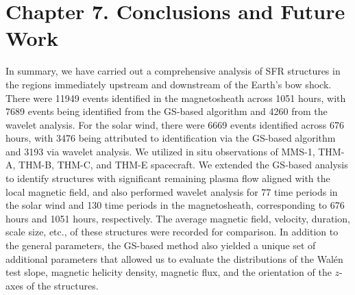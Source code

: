 \chapter{Chapter 7. Conclusions and Future Work}

In summary, we have carried out a comprehensive analysis of SFR structures in the regions immediately upstream and downstream of the Earth's bow shock. There were 11949 events identified in the magnetosheath across 1051 hours, with 7689 events being identified from the GS-based algorithm and 4260 from the wavelet analysis. For the solar wind, there were 6669 events identified across 676 hours, with 3476 being attributed to identification via the GS-based algorithm and 3193 via wavelet analysis. We utilized in situ observations of MMS-1, THM-A, THM-B, THM-C, and THM-E spacecraft. We extended the GS-based analysis to identify structures with significant remaining plasma flow aligned with the local magnetic field, and also performed wavelet analysis for 77 time periods in the solar wind and 130 time periods in the magnetosheath, corresponding to 676 hours and 1051 hours, respectively. The average magnetic field, velocity, duration, scale size, etc., of these structures were recorded for comparison. In addition to the general parameters, the GS-based method also yielded a unique set of additional parameters that allowed us to evaluate the distributions of the Wal\'en test slope, magnetic helicity density, magnetic flux, and the orientation of the $z$-axes of the structures.

